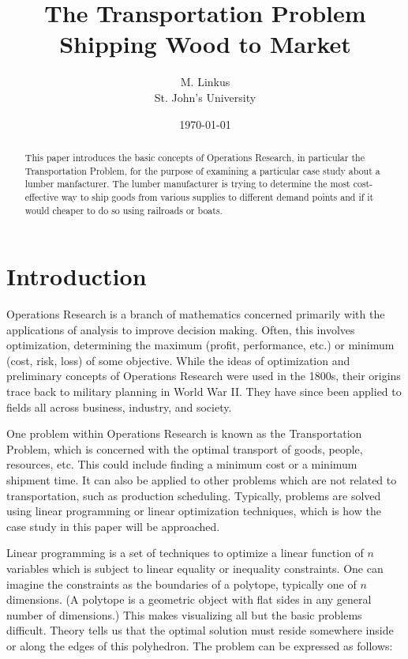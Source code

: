 \documentclass[12pt,letterpaper]{article}
\author{M. Linkus\\
St. John's University}
\title{The Transportation Problem
\\Shipping Wood to Market}
\date{\today}
\begin{document}
\maketitle
\begin{abstract}
	This paper introduces the basic concepts of Operations Research, in particular the Transportation Problem, for
the purpose of examining a particular case study about a lumber manfacturer.  The lumber manufacturer is trying to
determine the most cost-effective way to ship goods from various supplies to different demand points and if	it
would cheaper to do so using railroads or boats.
\end{abstract}
\tableofcontents
\pagebreak

\section{Introduction}

 Operations Research is a branch of mathematics concerned primarily with the applications of analysis to improve
decision making. Often, this involves optimization, determining the maximum (profit, performance, etc.) or minimum
(cost, risk, loss) of some objective. While the ideas of optimization and preliminary concepts of Operations Research
were used in the 1800s, their origins trace back to military planning in World War II.  They have since been applied to
fields all across business, industry, and society.

 One problem within Operations Research is known as the Transportation Problem, which is concerned with the optimal
transport of goods, people, resources, etc. This could include finding a minimum cost or a minimum shipment time. It
can also be applied to other problems which are not related to transportation, such as production scheduling.
Typically, problems are solved using linear programming or linear optimization techniques, which is how the case study
in this paper will be approached.

 Linear programming is a set of techniques to optimize a linear function of $n$ variables which is subject to linear
equality or inequality constraints.  One can imagine the constraints as the boundaries of a polytope, typically one
of $n$ dimensions.  (A polytope is a geometric object with flat sides in any general number of dimensions.)  This makes
visualizing all but the basic problems difficult.  Theory tells us that the optimal solution must reside somewhere
inside or along the edges of this polyhedron.  The problem can be expressed as follows:
\end{document}
